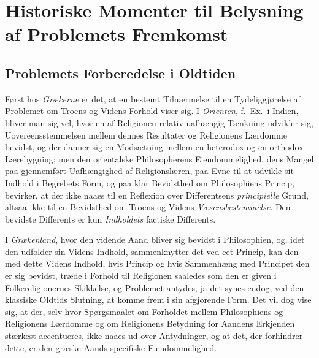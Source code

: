 \documentclass[12pt,a4paper]{book}
\newcommand{\opage}[1]{\marginnote{\footnotesize\textit{[#1]}}}
\begin{document}
\chapter{Historiske Momenter til Belysning af Problemets Fremkomst} \opage{8}
\label{ch:historiske}

\section{Problemets Forberedelse i Oldtiden}
\label{sec:oldtiden}

Først hos \emph{Grækerne} er det, at en bestemt Tilnærmelse til en
Tydeliggjørelse af Problemet om Troens og Videns Forhold viser sig. I \emph{Orienten}, f.~Ex.\ i Indien, bliver man sig vel, hvor en af Religionen
relativ uafhængig Tænkning udvikler sig, Uovereensstemmelsen mellem
dennes Resultater og Religionens Lærdomme bevidst, og der danner sig
en Modsætning mellem en heterodox og en orthodox Lærebygning; men den
orientalske Philosopherens Eiendommelighed, dens Mangel paa
gjennemført Uafhængighed af Religionslæren, paa Evne til at udvikle
sit Indhold i Begrebets Form, og paa klar Bevidsthed om Philosophiens
Princip, bevirker, at der ikke naaes til en Reflexion over
Differentsens \emph{principielle} Grund, altsaa ikke til en Bevidsthed om
Troens og Videns \emph{Væsensbestemmelse}. Den bevidste Differents er kun
\emph{Indholdets} factiske Differents.

I \emph{Grækenland}, hvor den vidende Aand bliver sig bevidst i Philosophien,
og, idet den udfolder sin Videns Indhold, sammenknytter det ved eet
Princip, kan den med dette Videns Indhold, hvis Princip og hvis
Sammenhæng med Principet den er sig bevidst, træde i Forhold til
Religionen saaledes som den er given i Folkereligionernes \opage{9}Skikkelse, og
Problemet antydes, ja det synes endog, ved den klassiske Oldtids
Slutning, at komme frem i sin afgjørende Form. Det vil dog vise sig,
at der, selv hvor Spørgsmaalet om Forholdet mellem Philosophiens og
Religionens Lærdomme og om Religionens Betydning for Aandens
Erkjenden stærkest accentueres, ikke naaes ud over Antydninger, og at
det, der forhindrer dette, er den græske Aands specifiske Eiendommelighed.
\end{document}

